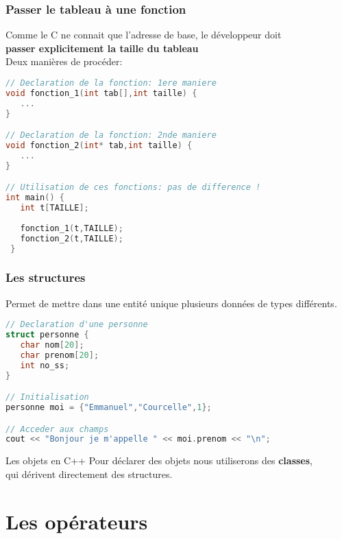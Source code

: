 \documentclass{beamer}
\begin{document}
\begin{frame}[fragile=singleslide,shrink=20]
\frametitle{Passer le tableau à une fonction}
Comme le C ne connait que l'adresse de base, le développeur doit \\
\textbf{passer explicitement la taille du tableau} \\
Deux manières de procéder:
\begin{lstlisting}[language=c++]
// Declaration de la fonction: 1ere maniere
void fonction_1(int tab[],int taille) {
   ...
}

// Declaration de la fonction: 2nde maniere
void fonction_2(int* tab,int taille) {
   ...
}

// Utilisation de ces fonctions: pas de difference !
int main() {
   int t[TAILLE];
   
   fonction_1(t,TAILLE);
   fonction_2(t,TAILLE);
 }
\end{lstlisting}
\end{frame}

\begin{frame}[fragile=singleslide,shrink=20]
\frametitle{Les structures}
Permet de mettre dans une entité unique plusieurs données de types différents.
\begin{lstlisting}[language=c++]
// Declaration d'une personne
struct personne {
   char nom[20];
   char prenom[20];
   int no_ss;
}

// Initialisation
personne moi = {"Emmanuel","Courcelle",1};

// Acceder aux champs
cout << "Bonjour je m'appelle " << moi.prenom << "\n";
\end{lstlisting}

\begin{block}{Les objets en C++}
Pour déclarer des objets nous utiliserons des \textbf{classes}, \\ qui dérivent directement des structures.
\end{block}
\end{frame}

\section{Les opérateurs}
\end{document}
